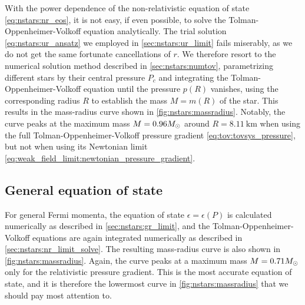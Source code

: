 With the power dependence of the non-relativistic equation of state \eqref{eq:nstars:nr_eos}, it is not easy, if even possible, to solve the Tolman-Oppenheimer-Volkoff equation analytically.
The trial solution \eqref{eq:nstars:ur_ansatz} we employed in \cref{sec:nstars:ur_limit} fails miserably, as we do not get the same fortunate cancellations of $r$.
We therefore resort to the numerical solution method described in \cref{sec:nstars:numtov}, parametrizing different stars by their central pressure $P_c$ and integrating the Tolman-Oppenheimer-Volkoff equation until the pressure $p(R)$ vanishes, using the corresponding radius $R$ to establish the mass $M = m(R)$ of the star.
This results in the mass-radius curve shown in \cref{fig:nstars:massradius}.
Notably, the curve peaks at the maximum mass $M = 0.96 M_\odot$ around $R = \SI{8.11}{\kilo\meter}$ when using the full Tolman-Oppenheimer-Volkoff pressure gradient \eqref{eq:tov:tovsys_pressure}, but not when using its Newtonian limit \eqref{eq:weak_field_limit:newtonian_pressure_gradient}.

\subsection{General equation of state}

For general Fermi momenta, the equation of state $\epsilon = \epsilon(P)$ is calculated numerically as described in \cref{sec:nstars:gr_limit}, and the Tolman-Oppenheimer-Volkoff equations are again integrated numerically as described in \cref{sec:nstars:nr_limit_solve}.
The resulting mass-radius curve is also shown in \cref{fig:nstars:massradius}.
Again, the curve peaks at a maximum mass $M = 0.71 M_\odot$ only for the relativistic pressure gradient.
This is the most accurate equation of state, and it is therefore the lowermost curve in \cref{fig:nstars:massradius} that we should pay most attention to.

\pgfmathsetmacro{\maxRnr}{\pgfmathresult}
\pgfmathsetmacro{\maxRgr}{\pgfmathresult}

